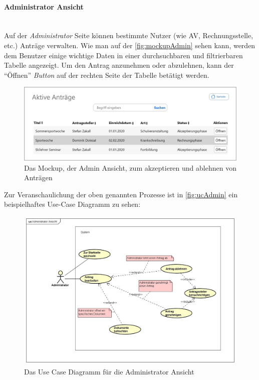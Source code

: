 \paragraph{Administrator Ansicht}
~\\
Auf der \textit{Administrator} Seite können bestimmte Nutzer (wie AV, Rechnungsstelle, etc.) Anträge verwalten. Wie man auf der \autoref{fig:mockupAdmin} sehen kann, werden dem Benutzer einige wichtige Daten in einer durchsuchbaren und filtrierbaren Tabelle angezeigt. Um den Antrag anzunehmen oder abzulehnen, kann der \enquote{Öffnen} \textit{Button} auf der rechten Seite der Tabelle betätigt werden.
\begin{figure}[H]
	\centering
	\includegraphics[width=1\linewidth]{images/ldehner_konzept/Mockup-Admin}
	\caption[Mockup Adminansicht]{Das Mockup, der Admin Ansicht, zum akzeptieren und ablehnen von Anträgen}
	\label{fig:mockupAdmin}
\end{figure}
Zur Veranschaulichung der oben genannten Prozesse ist in \autoref{fig:ucAdmin} ein beispielhaftes Use-Case Diagramm zu sehen: 
\begin{figure}[H]
	\centering
	\includegraphics[width=1\linewidth]{images/ldehner_konzept/uc-admin}
	\caption[Use Case Diagramm Adminansicht]{Das Use Case Diagramm für die Administrator Ansicht}
	\label{fig:ucAdmin}
\end{figure}
